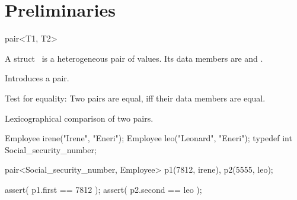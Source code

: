 

\cleardoublepage

\chapter{Preliminaries}



\ccHtmlNoClassLinks
\begin{ccClassTemplate}{pair<T1, T2>}


\ccDefinition

A struct \ccClassName\ is a heterogeneous pair of values. Its data members
are  and .

\ccHtmlLinksOff
{}
\ccHtmlLinksOn

\ccCreation
{}

             {Introduces a pair.}


\ccOperations

{Test for equality: Two pairs are equal, iff their data members are equal.}


{Lexicographical comparison of two pairs.}


\ccExample

\begin{cprog}
  Employee irene("Irene", "Eneri");
  Employee leo("Leonard", "Eneri");
  typedef int Social_security_number;

  pair<Social_security_number, Employee> p1(7812, irene),  p2(5555, leo);

  assert( p1.first == 7812 );
  assert( p2.second == leo );
  
\end{cprog} 
\end{ccClassTemplate}	
